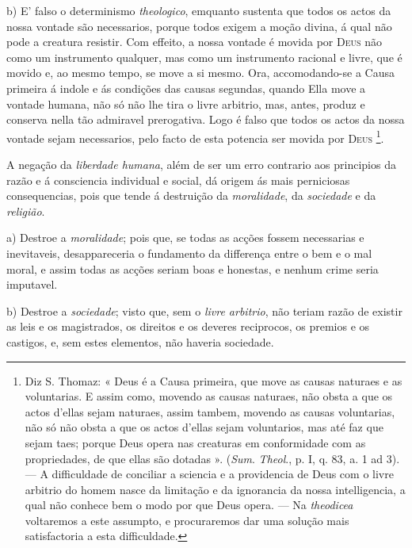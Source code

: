 b) E' falso o determinismo \emph{theologico}, emquanto sustenta que todos os actos da nossa vontade são necessarios, porque todos exigem a moção divina, á qual não pode a creatura resistir. Com effeito, a nossa vontade é movida por \textsc{Deus} não como um instrumento qualquer, mas como um instrumento racional e livre, que é movido e, ao mesmo tempo, se move a si mesmo. Ora, accomodando-se a Causa primeira á indole e ás condições das causas segundas, quando Ella move a vontade humana, não só não lhe tira o livre arbitrio, mas, antes, produz e conserva nella tão admiravel prerogativa. Logo é falso que todos os actos da nossa vontade sejam necessarios, pelo facto de esta potencia ser movida por \textsc{Deus} \footnote{Diz S. Thomaz: « Deus é a Causa primeira, que move as causas naturaes e as voluntarias. E assim como, movendo as causas naturaes, não obsta a que os actos d'ellas sejam naturaes, assim tambem, movendo as causas voluntarias, não só não obsta a que os actos d'ellas sejam voluntarios, mas até faz que sejam taes; porque Deus opera nas creaturas em conformidade com as propriedades, de que ellas são dotadas ». (\emph{Sum}. \emph{Theol}., p. I, q. 83, a. 1 ad 3). --- A difficuldade de conciliar a sciencia e a providencia de Deus com o livre arbitrio do homem nasce da limitação e da ignorancia da nossa intelligencia, a qual não conhece bem o modo por que Deus opera. --- Na \emph{theodicea} voltaremos a este assumpto, e procuraremos dar uma solução mais satisfactoria a esta difficuldade.}.


 
A negação da \emph{liberdade humana}, além de ser um erro contrario aos principios da razão e á consciencia individual e social, dá origem ás mais perniciosas consequencias, pois que tende á destruição da \emph{moralidade}, da \emph{sociedade} e da \emph{religião}.

a) Destroe a \emph{moralidade}; pois que, se todas as acções fossem necessarias e inevitaveis, desappareceria o fundamento da differença entre o bem e o mal moral, e assim todas as acções seriam boas e honestas, e nenhum crime seria imputavel.

b) Destroe a \emph{sociedade}; visto que, sem o \emph{livre arbitrio}, não teriam razão de existir as leis e os magistrados, os direitos e os deveres reciprocos, os premios e os castigos, e, sem estes elementos, não haveria sociedade.

